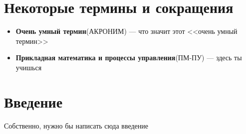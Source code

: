 \chapter*{Некоторые термины и сокращения}

\begin{itemize}
    \item \textbf{Очень умный термин}(АКРОНИМ) --- что значит этот <<очень умный термин>>
    \item \textbf{Прикладная математика и процессы управления}(ПМ-ПУ) --- здесь ты учишься
\end{itemize}
 

\chapter*{Введение}
   Собственно, нужно бы написать сюда введение
\endinput
